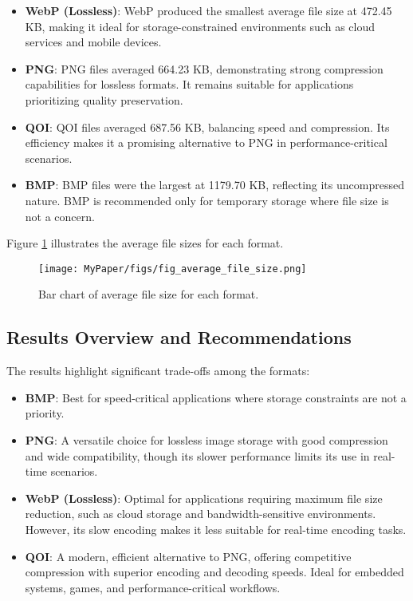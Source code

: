 \documentclass[conference]{IEEEtran}
\begin{document}
\begin{itemize}
    \item \textbf{WebP (Lossless)}: WebP produced the smallest average file size at 472.45 KB, making it ideal for storage-constrained environments such as cloud services and mobile devices.
    \item \textbf{PNG}: PNG files averaged 664.23 KB, demonstrating strong compression capabilities for lossless formats. It remains suitable for applications prioritizing quality preservation.
    \item \textbf{QOI}: QOI files averaged 687.56 KB, balancing speed and compression. Its efficiency makes it a promising alternative to PNG in performance-critical scenarios.
    \item \textbf{BMP}: BMP files were the largest at 1179.70 KB, reflecting its uncompressed nature. BMP is recommended only for temporary storage where file size is not a concern.
\end{itemize}

Figure \ref{fig:file_size_bar} illustrates the average file sizes for each format.

\begin{figure}[htbp]
    \centering
    \texttt{[image: MyPaper/figs/fig\_average\_file\_size.png]}
    \caption{Bar chart of average file size for each format.}
    \label{fig:file_size_bar}
\end{figure}

\subsection{Results Overview and Recommendations}

The results highlight significant trade-offs among the formats:

\begin{itemize}
    \item \textbf{BMP}: Best for speed-critical applications where storage constraints are not a priority.
    \item \textbf{PNG}: A versatile choice for lossless image storage with good compression and wide compatibility, though its slower performance limits its use in real-time scenarios.
    \item \textbf{WebP (Lossless)}: Optimal for applications requiring maximum file size reduction, such as cloud storage and bandwidth-sensitive environments. However, its slow encoding makes it less suitable for real-time encoding tasks.
    \item \textbf{QOI}: A modern, efficient alternative to PNG, offering competitive compression with superior encoding and decoding speeds. Ideal for embedded systems, games, and performance-critical workflows.
\end{itemize}
\end{document}
